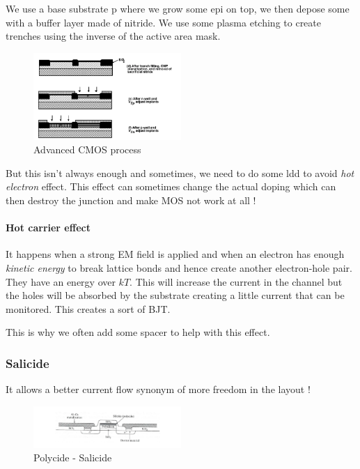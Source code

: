 \documentclass[
]{article}
\begin{document}
We use a base substrate p where we grow some {epi} on top, we then
depose some with a buffer layer made of nitride. We use some plasma
etching to create trenches using the inverse of the active area mask.

\begin{figure}
\hypertarget{fig:enter-label}{%
\centering
\includegraphics[width=0.5\textwidth,height=\textheight]{advanced_cmos.png}
\caption{Advanced CMOS process}\label{fig:enter-label}
}
\end{figure}

But this isn't always enough and sometimes, we need to do some {ldd} to
avoid \emph{hot electron} effect. This effect can sometimes change the
actual doping which can then destroy the junction and make MOS not work
at all !

\hypertarget{hot-carrier-effect}{%
\paragraph{Hot carrier effect}\label{hot-carrier-effect}}

It happens when a strong EM field is applied and when an electron has
enough \emph{kinetic energy} to break lattice bonds and hence create
another electron-hole pair. They have an energy over \(kT\). This will
increase the current in the channel but the holes will be absorbed by
the substrate creating a little current that can be monitored. This
creates a sort of BJT.

This is why we often add some spacer to help with this effect.

\hypertarget{salicide}{%
\subsubsection{Salicide}\label{salicide}}

It allows a better current flow synonym of more freedom in the layout !

\begin{figure}
\hypertarget{fig:enter-label}{%
\centering
\includegraphics[width=0.5\textwidth,height=\textheight]{polycide_salicide.png}
\caption{Polycide - Salicide}\label{fig:enter-label}
}
\end{figure}
\end{document}
